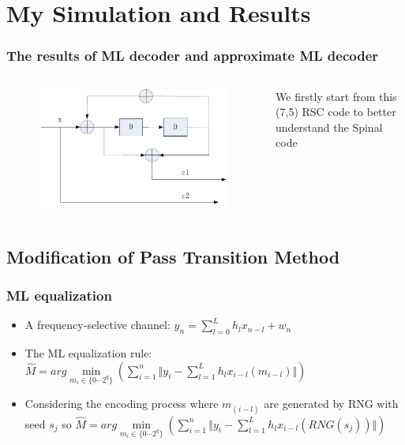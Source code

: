 \documentclass{beamer}
\begin{document}
\section{My Simulation and Results} %
\begin{frame}
\frametitle{The results of ML decoder and approximate ML decoder}
\begin{columns}
\begin{figure}
\includegraphics[width=.99\textwidth]{Rsccode.pdf}
\end{figure}
We firstly start from this (7,5) RSC code to better understand the Spinal code
\end{columns}
\end{frame}

\subsection{Modification of Pass Transition Method } %


\begin{frame}
\frametitle{ML equalization}
\begin{itemize}
\item A frequency-selective channel: $y_n=\sum_{l=0}^Lh_lx_{n-l}+w_n$
\item The ML equalization rule: 
$\widehat{M} =arg \min\limits_{m_i\in\{0\cdots2^q\}}(\sum_{i=1}^n\Vert y_i-\sum_{l=1}^Lh_lx_{i-l}(m_{i-l})\Vert )$
\item Considering the encoding process where $m_(i-l)$ are generated by RNG with seed $s_j$ so 
 $\widehat{M} =arg \min\limits_{m_i\in\{0\cdots2^q\}}(\sum_{i=1}^n\Vert y_i-\sum_{l=1}^Lh_lx_{i-l}(RNG(s_j))\Vert )$
\end{itemize}
\end{frame}
\end{document}
